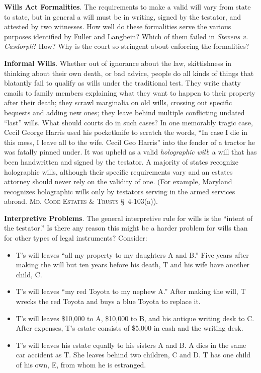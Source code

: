 
\item \textbf{Wills Act Formalities}. The requirements to make a valid will vary
from state to state, but in general a will must be in writing, signed by the
testator, and attested by two witnesses. How well do these formalities serve
the various purposes identified by Fuller and Langbein? Which of them failed in
\textit{Stevens v. Casdorph}? How? Why is the court so stringent about
enforcing the formalities?


\item \textbf{Informal Wills}. Whether out of ignorance about the law,
skittishness in thinking about their own death, or bad advice, people do all
kinds of things that blatantly fail to qualify as wills under the traditional
test. They write chatty emails to family members explaining what they want to
happen to their property after their death; they scrawl marginalia on old
wills, crossing out specific bequests and adding new ones; they leave behind
multiple conflicting undated ``last'' wills. What should courts do in such
cases? In one memorably tragic case, Cecil George Harris used his pocketknife
to scratch the words, ``In case I die in this mess, I leave all to the wife.
Cecil Geo Harris'' into the fender of a tractor he was fatally
pinned under. It was upheld as a valid \textit{holographic} \textit{will}: a
will that has been handwritten and signed by the testator. A majority of states
recognize holographic wills, although their specific requirements vary and an
estates attorney should never rely on the validity of one. (For example,
Maryland recognizes holographic wills only by testators serving in the armed
services abroad. \textsc{Md. Code Estates \& Trusts} \S~4-103(a)).


\item \textbf{Interpretive Problems}. The general interpretive rule for wills is
the ``intent of the testator.'' Is there any reason this might be a harder
problem for wills than for other types of legal instruments? Consider:
\begin{itemize}
\item T's will leaves ``all my property to my daughters A and B.'' Five years
after making the will but ten years before his death, T and his wife have
another child, C.
\item T's will leaves ``my red Toyota to my nephew A.'' After making the will, T
wrecks the red Toyota and buys a blue Toyota to replace it.
\item T's will leaves \$10,000 to A, \$10,000 to B, and his antique writing desk
to C. After expenses, T's estate consists of \$5,000 in cash and the writing
desk.
\item T's will leaves his estate equally to his sisters A and B. A dies in the
same car accident as T. She leaves behind two children, C and D. T has one
child of his own, E, from whom he is estranged.
\end{itemize}


